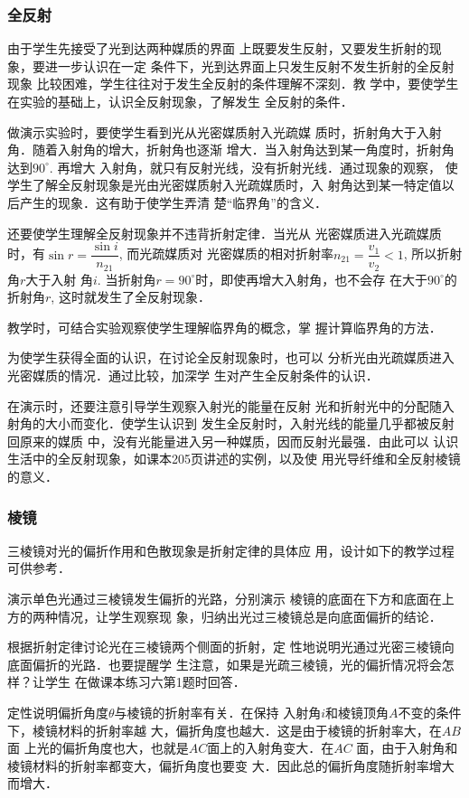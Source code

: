 \subsubsection{全反射}
 由于学生先接受了光到达两种媒质的界面
上既要发生反射，又要发生折射的现象，要进一步认识在一定
条件下，光到达界面上只发生反射不发生折射的全反射现象
比较困难，学生往往对于发生全反射的条件理解不深刻．教
学中，要使学生在实验的基础上，认识全反射现象，了解发生
全反射的条件．

做演示实验时，要使学生看到光从光密媒质射入光疏媒
质时，折射角大于入射角．随着入射角的增大，折射角也逐渐
增大．当入射角达到某一角度时，折射角达到$90^{\circ}$. 再增大
入射角，就只有反射光线，没有折射光线．通过现象的观察，
使学生了解全反射现象是光由光密媒质射入光疏媒质时，入
射角达到某一特定值以后产生的现象．这有助于使学生弄清
楚“临界角”的含义．

还要使学生理解全反射现象并不违背折射定律．当光从
光密媒质进入光疏媒质时，有$\sin r=\dfrac{\sin i}{n_{21}}$, 而光疏媒质对
光密媒质的相对折射率$n_{21}=\dfrac{v_1}{v_2}<1$, 所以折射角$r$大于入射
角$i$. 当折射角$r=90^{\circ}$时，即使再增大入射角，也不会存
在大于$90^{\circ}$的折射角$r$, 这时就发生了全反射现象．

教学时，可结合实验观察使学生理解临界角的概念，掌
握计算临界角的方法．

为使学生获得全面的认识，在讨论全反射现象时，也可以
分析光由光疏媒质进入光密媒质的情况．通过比较，加深学
生对产生全反射条件的认识．

在演示时，还要注意引导学生观察入射光的能量在反射
光和折射光中的分配随入射角的大小而变化．使学生认识到
发生全反射时，入射光线的能量几乎都被反射回原来的媒质
中，没有光能量进入另一种媒质，因而反射光最强．由此可以
认识生活中的全反射现象，如课本205页讲述的实例，以及使
用光导纤维和全反射棱镜的意义．

\subsubsection{棱镜}
三棱镜对光的偏折作用和色散现象是折射定律的具体应
用，设计如下的教学过程可供参考．

演示单色光通过三棱镜发生偏折的光路，分别演示
棱镜的底面在下方和底面在上方的两种情况，让学生观察现
象，归纳出光过三棱镜总是向底面偏折的结论．

根据折射定律讨论光在三棱镜两个侧面的折射，定
性地说明光通过光密三棱镜向底面偏折的光路．也要提醒学
生注意，如果是光疏三棱镜，光的偏折情况将会怎样？让学生
在做课本练习六第1题时回答．

定性说明偏折角度$\theta$与棱镜的折射率有关．在保持
入射角$i$和棱镜顶角$A$不变的条件下，棱镜材料的折射率越
大，偏折角度也越大．这是由于棱镜的折射率大，在$AB$面
上光的偏折角度也大，也就是$AC$面上的入射角变大．在$AC$
面，由于入射角和棱镜材料的折射率都变大，偏折角度也要变
大．因此总的偏折角度随折射率增大而增大．

